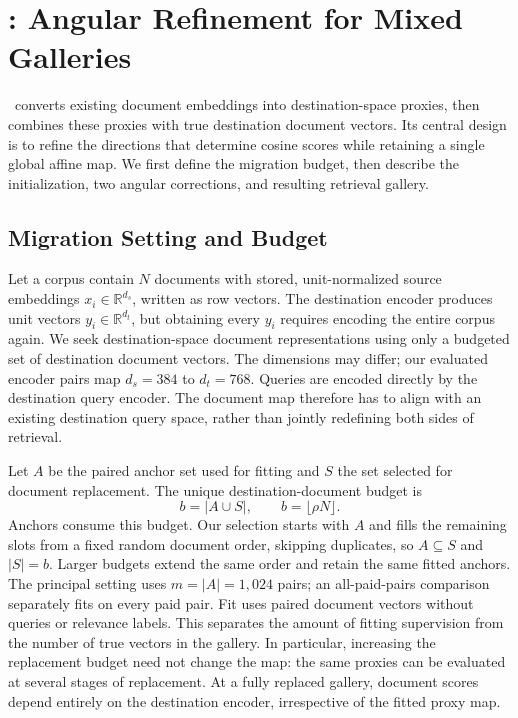 \section{\method: Angular Refinement for Mixed Galleries}
\label{sec:method}

\method\ converts existing document embeddings into destination-space proxies,
then combines these proxies with true destination document vectors. Its central
design is to refine the directions that determine cosine scores while retaining
a single global affine map. We first define the migration budget, then describe
the initialization, two angular corrections, and resulting retrieval gallery.

\subsection{Migration Setting and Budget}
\label{sec:setting}

Let a corpus contain $N$ documents with stored, unit-normalized source embeddings
$x_i\in\mathbb{R}^{d_s}$, written as row vectors. The destination encoder produces
unit vectors $y_i\in\mathbb{R}^{d_t}$, but obtaining every $y_i$ requires encoding
the entire corpus again. We seek destination-space document representations
using only a budgeted set of destination document vectors. The dimensions may
differ; our evaluated encoder pairs map $d_s=384$ to $d_t=768$. Queries are encoded
directly by the destination query encoder. The document map therefore has to
align with an existing destination query space, rather than jointly redefining
both sides of retrieval.

Let $A$ be the paired anchor set used for fitting and $S$ the set selected for
document replacement. The unique destination-document budget is
\begin{equation}
 b=|A\cup S|,\qquad b=\lfloor\rho N\rfloor .
 \label{eq:budget}
\end{equation}
Anchors consume this budget. Our selection starts with $A$ and fills the
remaining slots from a fixed random document order, skipping duplicates, so
$A\subseteq S$ and $|S|=b$. Larger budgets extend the same order and retain the
same fitted anchors. The principal setting uses $m=|A|=1{,}024$ pairs; an
all-paid-pairs comparison separately fits on every paid pair. Fit uses paired
document vectors without queries or relevance labels. This separates the
amount of fitting supervision from the number of true vectors in the gallery.
In particular, increasing the replacement budget need not change the map:
the same proxies can be evaluated at several stages of replacement. At a
fully replaced gallery, document scores depend entirely on the destination
encoder, irrespective of the fitted proxy map.

